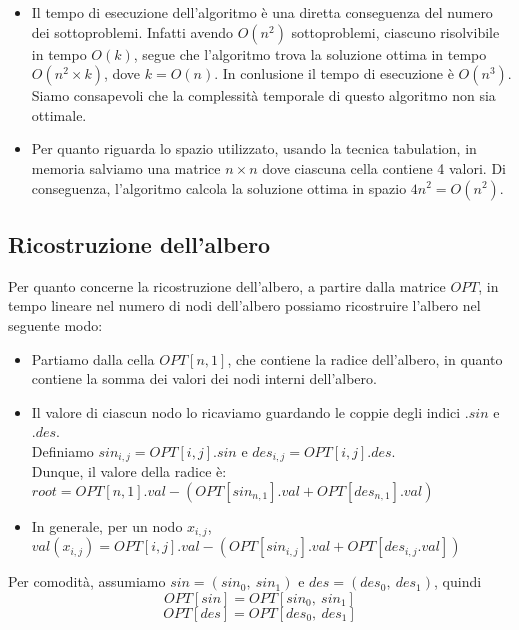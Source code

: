 \begin{itemize}
	\item{
		Il tempo di esecuzione dell'algoritmo è una diretta conseguenza del numero dei sottoproblemi. Infatti avendo $O(n^2)$ sottoproblemi,
		ciascuno risolvibile in tempo $O(k)$, segue che l'algoritmo trova la soluzione ottima in tempo $O(n^2 \times k)$, dove $k = O(n)$. 
		In conlusione il tempo di esecuzione è $O(n^3)$.\\
		Siamo consapevoli che la complessità temporale di questo algoritmo non sia ottimale.
	}
	\item{
		Per quanto riguarda lo spazio utilizzato, usando la tecnica tabulation, in memoria salviamo una matrice $n \times n$ dove ciascuna cella contiene 4 valori.
		Di conseguenza, l'algoritmo calcola la soluzione ottima in spazio $4n^2 = O(n^2)$.
	}
\end{itemize}

\subsection{Ricostruzione dell'albero}

Per quanto concerne la ricostruzione dell'albero, a partire dalla matrice $OPT$, in tempo lineare nel numero di nodi dell'albero possiamo ricostruire l'albero nel seguente modo:

\begin{itemize}
	\item Partiamo dalla cella $OPT[n, 1]$, che contiene la radice dell'albero, in quanto contiene la somma dei valori dei nodi interni dell'albero.
	\item {
		Il valore di ciascun nodo lo ricaviamo guardando le coppie degli indici $.sin$ e $.des$.\\
		Definiamo $sin_{i,j} = OPT[i, j].sin$ e $des_{i,j} = OPT[i, j].des$.\\
		Dunque, il valore della radice è:\\
		$root = OPT[n, 1].val - (OPT[sin_{n,1}].val + OPT[des_{n, 1}].val)$
		}
	\item {
		In generale, per un nodo $x_{i,j}$, $val(x_{i,j}) = OPT[i, j].val - (OPT[sin_{i,j}].val + OPT[des_{i,j}.val])$
	}
\end{itemize}

Per comodità, assumiamo $sin = (sin_{0},\ sin_{1})$ e $des = (des_{0},\ des_{1})$, quindi
$$
OPT[sin] = OPT[sin_{0},\ sin_{1}]
$$
$$
OPT[des] = OPT[des_{0},\ des_{1}]
$$ 

